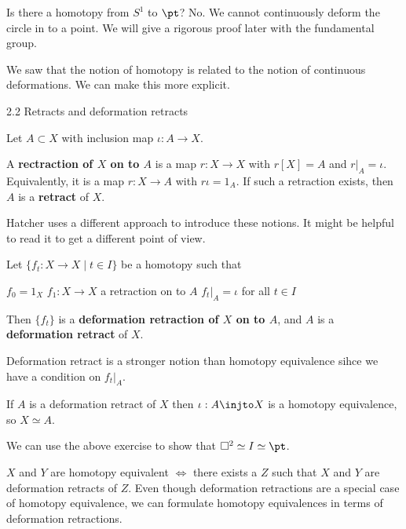 Is there a homotopy from $S^1$ to $\pt$?
No.
We cannot continuously deform the circle in to a point.
We will give a rigorous proof later with the fundamental group.

We saw that the notion of homotopy is related to the notion of continuous deformations.
We can make this more explicit.

2.2 Retracts and deformation retracts

Let $A \subset X$ with inclusion map $\iota: A \to X$.

\begin{defn}
	A \textbf{rectraction of $X$ on to $A$} is a map $r:X \to X$ with $r[X]=A$ and $r|_A=\iota$.
	Equivalently, it is a map $r:X \to A$ with $r\iota=1_A$.
	If such a retraction exists, then $A$ is a \textbf{retract} of $X$.
\end{defn}

\begin{rmk}
	Hatcher uses a different approach to introduce these notions.
	It might be helpful to read it to get a different point of view.
\end{rmk}

\begin{defn}
	Let $\{f_t:X \to X \mid t \in I\}$ be a homotopy such that
	\begin{itm}
		\io $f_0=1_X$
		\io $f_1:X \to X$ a retraction on to $A$
		\io $f_t|_A=\iota$ for all $t \in I$
	\end{itm}
	Then $\{f_t\}$ is a \textbf{deformation retraction of $X$ on to $A$}, and $A$ is a \textbf{deformation retract} of $X$.
\end{defn}

\begin{rmk}
	Deformation retract is a stronger notion than homotopy equivalence sihce we have a condition on $f_t|_A$.
\end{rmk}

\begin{exer}
	If $A$ is a deformation retract of $X$ then $\iota:A \injto X$ is a homotopy equivalence, so $X \simeq A$.
\end{exer}

\begin{rmk}
	We can use the above exercise to show that $\square^2 \simeq I \simeq \pt$.
\end{rmk}

\begin{rmk}
	$X$ and $Y$ are homotopy equivalent $\iff$ there exists a $Z$ such that $X$ and $Y$ are deformation retracts of $Z$.
	Even though deformation retractions are a special case of homotopy equivalence, we can formulate homotopy equivalences in terms of deformation retractions.
\end{rmk}

